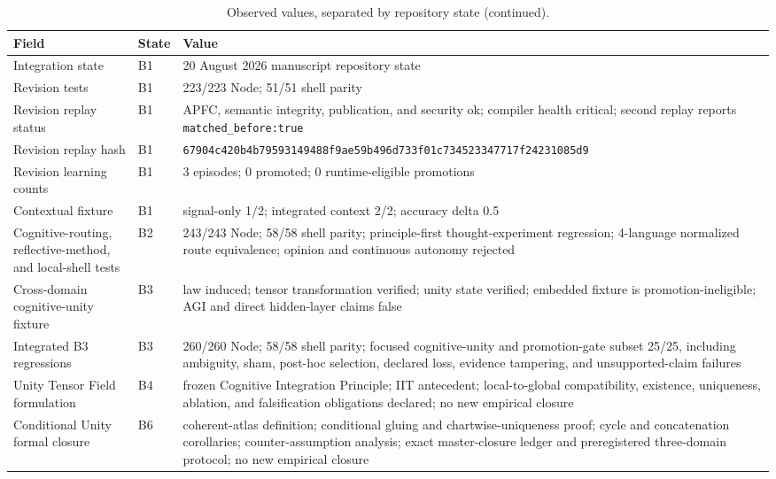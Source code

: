 \documentclass[10pt,twocolumn]{article}
\theoremstyle{definition}
\theoremstyle{plain}
\theoremstyle{remark}
\newcommand{\file}[1]{\nolinkurl{#1}}
\newcommand{\revision}{\textsf{B1}}
\newcommand{\cognitive}{\textsf{B2}}
\newcommand{\unity}{\textsf{B3}}
\newcommand{\unitytheory}{\textsf{B4}}
\newcommand{\formalclosure}{\textsf{B6}}
\begin{document}
\begin{table}[!t]
\centering
\caption{Observed values, separated by repository state (continued).}
\scriptsize
\begin{tabularx}{\textwidth}{@{}p{}p{}X@{}}
\toprule
Field & State & Value \\
\midrule
Integration state & \revision & 20 August 2026 manuscript repository state \\
Revision tests & \revision & 223/223 Node; 51/51 shell parity \\
Revision replay status & \revision & APFC, semantic integrity, publication, and security ok; compiler health critical; second replay reports \file{matched_before:true} \\
Revision replay hash & \revision & \scriptsize\file{67904c420b4b79593149488f9ae59b496d733f01c734523347717f24231085d9} \\
Revision learning counts & \revision & 3 episodes; 0 promoted; 0 runtime-eligible promotions \\
Contextual fixture & \revision & signal-only 1/2; integrated context 2/2; accuracy delta 0.5 \\
Cognitive-routing, reflective-method, and local-shell tests & \cognitive & 243/243 Node; 58/58 shell parity; principle-first thought-experiment regression; 4-language normalized route equivalence; opinion and continuous autonomy rejected \\
Cross-domain cognitive-unity fixture & \unity & law induced; tensor transformation verified; unity state verified; embedded fixture is promotion-ineligible; AGI and direct hidden-layer claims false \\
Integrated B3 regressions & \unity & 260/260 Node; 58/58 shell parity; focused cognitive-unity and promotion-gate subset 25/25, including ambiguity, sham, post-hoc selection, declared loss, evidence tampering, and unsupported-claim failures \\
Unity Tensor Field formulation & \unitytheory & frozen Cognitive Integration Principle; IIT antecedent; local-to-global compatibility, existence, uniqueness, ablation, and falsification obligations declared; no new empirical closure \\
Conditional Unity formal closure & \formalclosure & coherent-atlas definition; conditional gluing and chartwise-uniqueness proof; cycle and concatenation corollaries; counter-assumption analysis; exact master-closure ledger and preregistered three-domain protocol; no new empirical closure \\

\end{tabularx}
\end{table}
\end{document}
